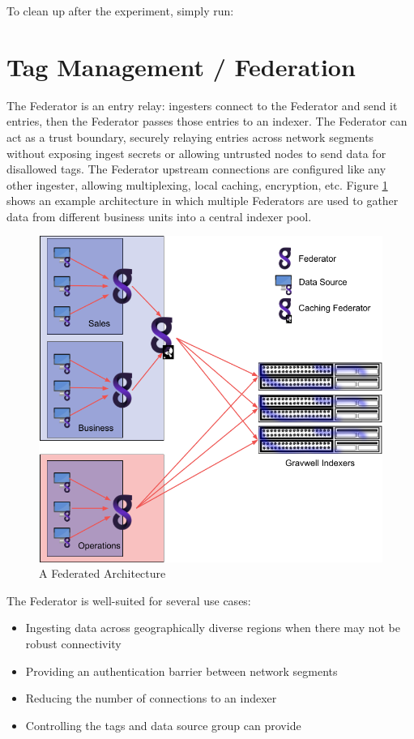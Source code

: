 To clean up after the experiment, simply run:


\clearpage
\section{Tag Management / Federation}
\label{sec:federator}
The Federator is an entry relay: ingesters connect to the Federator and
send it entries, then the Federator passes those entries to an indexer.
The Federator can act as a trust boundary, securely relaying entries
across network segments without exposing ingest secrets or allowing
untrusted nodes to send data for disallowed tags. The Federator upstream
connections are configured like any other ingester, allowing
multiplexing, local caching, encryption, etc. Figure \ref{fig:federation}
shows an example architecture in which multiple Federators are used
to gather data from different business units into a central indexer pool.

\begin{figure}
	\includegraphics[width=0.75\linewidth]{images/federated-architecture.png}
	\caption{A Federated Architecture}
	\label{fig:federation}
\end{figure}

The Federator is well-suited for several use cases:

\begin{itemize}
\item
  Ingesting data across geographically diverse regions when there may
  not be robust connectivity
\item
  Providing an authentication barrier between network segments
\item
  Reducing the number of connections to an indexer
\item
  Controlling the tags and data source group can provide
\end{itemize}

